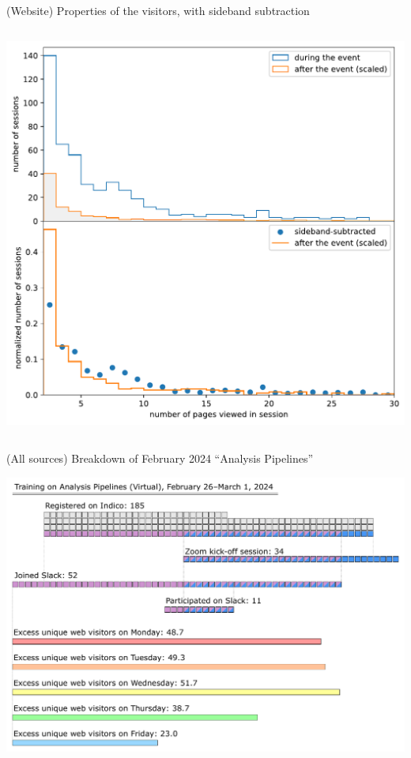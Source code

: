 \documentclass[aspectratio=169]{beamer}
\begin{document}
\begin{frame}{(Website) Properties of the visitors, with sideband subtraction}
\begin{columns}
\includegraphics[width=\linewidth]{PLOTS/during-and-after-event-pages-viewed.pdf}
\end{columns}

\vspace{0.75 cm}

\vspace{0.25 cm}
\end{frame}

\begin{frame}{(All sources) Breakdown of February 2024 ``Analysis Pipelines''}
\vspace{0.15 cm}
\begin{center}
\includegraphics[width=0.8\linewidth]{PLOTS/how-many-participated.pdf}
\end{center}
\end{frame}
\end{document}
